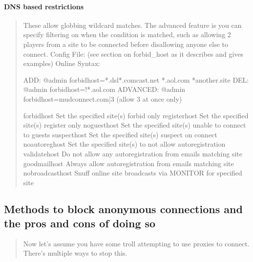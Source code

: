 \documentclass[letterpaper,10pt,english]{sphinxmanual}
\begin{document}
\paragraph{DNS based restrictions}
\label{\detokenize{security:dns-based-restrictions}}\begin{quote}

\sphinxAtStartPar
These allow globbing wildcard matches.
The advanced feature is you can specify filtering on
when the condition is matched, such as allowing 2 players from a site to
be connected before disallowing anyone else to connect.
Config File: (see section on forbid\_host as it describes and gives examples)
Online Syntax:

\begin{sphinxVerbatim}[commandchars=\\\{\}]
        ADD:      @admin forbid\PYGZus{}host=*.dsl*.comcast.net *.aol.com *another.site
        DEL:      @admin forbid\PYGZus{}host=!*.aol.com
        ADVANCED: @admin forbid\PYGZus{}host=mudconnect.com|3 (allow 3 at once only)

forbid\PYGZus{}host     \PYGZhy{} Set the specified site(s) forbid only
register\PYGZus{}host   \PYGZhy{} Set the specified site(s) register only
noguest\PYGZus{}host    \PYGZhy{} Set the specified site(s) unable to connect to guests
suspect\PYGZus{}host    \PYGZhy{} Set the specified site(s) suspect on connect
noautoreg\PYGZus{}host  \PYGZhy{} Set the specified site(s) to not allow autoregistration
validate\PYGZus{}host   \PYGZhy{} Do not allow any autoregistration from emails matching site
goodmail\PYGZus{}host   \PYGZhy{} Always allow autoregistration from emails matching site
nobroadcast\PYGZus{}host \PYGZhy{} Snuff online site broadcasts via MONITOR for specified site
\end{sphinxVerbatim}
\end{quote}


\subsection{Methods to block anonymous connections and the pros and cons of doing so}
\label{\detokenize{security:methods-to-block-anonymous-connections-and-the-pros-and-cons-of-doing-so}}\begin{quote}

\sphinxAtStartPar
Now let’s assume you have some troll attempting to use proxies to connect.
There’s multiple ways to stop this.
\end{quote}
\end{document}

